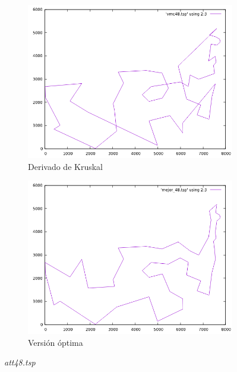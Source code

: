 \documentclass[12pt,spanish]{article}
\begin{document}
\begin{figure}[H]
\begin{subfigure}[b]{0.36\textwidth}
\includegraphics[width=\textwidth]{att48_vmc.png}
\caption{Derivado de Kruskal}
\end{subfigure}
\quad
\begin{subfigure}[b]{0.36\textwidth}
\includegraphics[width=\textwidth]{att48_mejor.png}
\caption{Versión óptima}
\end{subfigure}
\caption{\textit{att48.tsp}}
\end{figure}
\end{document}
